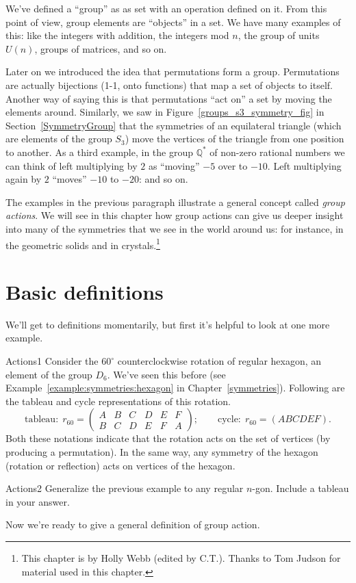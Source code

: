 We've defined a  ``group'' as as set with an operation defined on it.  From this point of view, group elements are ``objects'' in a set. We have many examples of this: like the integers with addition, the integers mod $n$, the group of units $U(n)$, groups of matrices, and so on.

Later on we introduced the idea that permutations form a group. Permutations are actually bijections (1-1, onto functions) that map a set of objects to itself.  Another way of saying this is that permutations ``act on'' a set by moving the elements around.  Similarly, we saw in Figure~\ref{groups_s3_symmetry_fig} in Section~\ref{SymmetryGroup} that the symmetries of an equilateral triangle (which are elements of the group $S_3$) move the vertices of the triangle from one position to another.  As a third example, in the group $\mathbb {Q}^*$ of non-zero rational numbers we can think of left multiplying by $2$ as ``moving''  $-5$ over to $-10$.  Left multiplying again by $2$ ``moves'' $-10$ to $-20$: and so on.   

The examples in the previous paragraph  illustrate a general concept called \emph{group actions}. We will see in this chapter how group actions can give us deeper insight into many of the symmetries that we see in the world around us: for instance, in the geometric solids and in crystals.\footnote{This chapter  is by Holly Webb (edited by C.T.). Thanks to Tom Judson for material used in this chapter.}

\section {Basic definitions}\label{DefActions}
We'll get to definitions momentarily, but first it's helpful to look at one more example.

\begin{example}{Actions1} 
Consider the $60^{\circ}$ counterclockwise rotation of regular hexagon, an element of the group $D_6$.  We've seen this before (see Example~\ref{example:symmetries:hexagon} in Chapter~\ref{symmetries}). Following are the tableau and cycle representations of this rotation. 
\[ \text{tableau:}~~r_{60} = \begin{pmatrix} A & B & C & D & E & F \\ B & C & D & E & F  & A \end{pmatrix}; \qquad 
\text{cycle:}~~r_{60}=(A B C D E F).\]
 Both these notations indicate that the rotation acts on the set of vertices (by producing a permutation).  In the same way, any symmetry of the hexagon (rotation or reflection) acts on vertices of the hexagon.
\end{example}
	\begin {exercise}{Actions2}  Generalize the previous example to any regular $n$-gon. Include a tableau in your answer.
\end {exercise}
Now we're ready to give a general definition of group action. 

